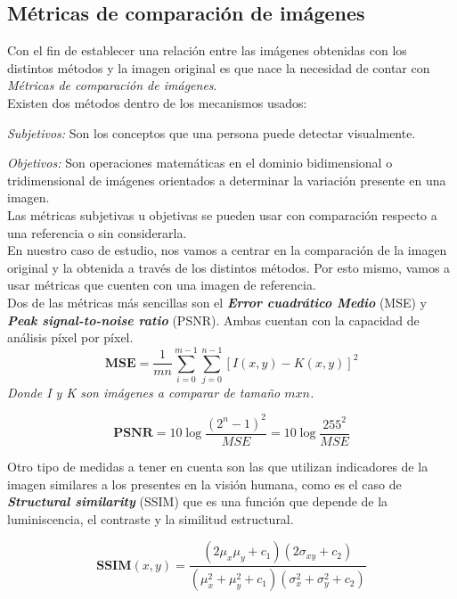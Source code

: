 \documentclass[a4paper]{article}
\begin{document}
\newpage


\newpage
\subsection{M\'etricas de comparaci\'on de im\'agenes}

Con el fin de establecer una relaci\'on entre las im\'agenes obtenidas con los distintos m\'etodos y la imagen original es que nace la necesidad de contar con \emph{M\'etricas de comparaci\'on de im\'agenes}.\\

Existen dos m\'etodos dentro de los mecanismos usados:

\emph{Subjetivos:} Son los conceptos que una persona puede detectar visualmente.

\emph{Objetivos:} Son operaciones matem\'aticas en el dominio bidimensional o tridimensional de im\'agenes orientados a determinar la variaci\'on presente en una imagen.\\

Las métricas subjetivas u objetivas se pueden usar con comparación respecto a una referencia o sin considerarla.\\

En nuestro caso de estudio, nos vamos a centrar en la comparaci\'on de la imagen original y la obtenida a trav\'es de los distintos m\'etodos. Por esto mismo, vamos a usar m\'etricas que cuenten con una imagen de referencia.\\

 Dos de las m\'etricas m\'as sencillas son el \emph{\textbf{Error cuadr\'atico Medio}} (MSE) y \emph{\textbf{Peak signal-to-noise ratio}} (PSNR). Ambas cuentan con la capacidad de an\'alisis p\'ixel por p\'ixel.\\

\[
 \textbf{MSE} = \frac{1}{mn} \sum_{i=0}^{m-1} \sum_{j=0}^{n-1} [I(x,y) - K(x,y)]^2
\]
  \indent \indent \indent \textit{Donde I y K son imágenes a comparar de tamaño $mxn$.}



\[
 \textbf{PSNR} = 10 \log \frac{(2^n-1)^2}{MSE} = 10 \log \frac{255^2}{MSE}
\]

Otro tipo de medidas a tener en cuenta son las que utilizan indicadores de la imagen similares a los presentes en la visi\'on humana, como es el caso de \emph{\textbf{Structural similarity}} (SSIM) que es una funci\'on que depende de la luminiscencia, el contraste y la similitud estructural.

\[
 \textbf{SSIM}(x,y) = \frac{(2\mu_x\mu_y+c_1)(2\sigma_{xy}+c_2)}{(\mu_x^2+\mu_y^2+c_1)(\sigma_x^2+\sigma_y^2+c_2)}
\]
\end{document}
